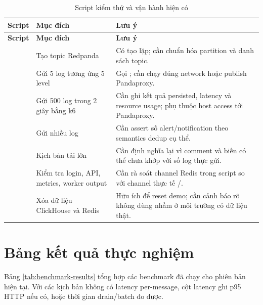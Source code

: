 \begin{longtable}{|P{4.0cm}|P{4.3cm}|P{5.5cm}|}
\caption{Script kiểm thử và vận hành hiện có}
\label{tab:scripts}\\
\hline
\textbf{Script} & \textbf{Mục đích} & \textbf{Lưu ý} \\ \hline
\endfirsthead
\hline
\textbf{Script} & \textbf{Mục đích} & \textbf{Lưu ý} \\ \hline
\endhead
{} & Tạo topic Redpanda & Có tạo  lặp; cần chuẩn hóa partition và danh sách topic. \\ \hline
{} & Gửi 5 log tương ứng 5 level & Gọi ; cần chạy đúng network hoặc publish Pandaproxy. \\ \hline
{} & Gửi 500 log trong 2 giây bằng k6 & Cần ghi kết quả persisted, latency và resource usage; phụ thuộc host access tới Pandaproxy. \\ \hline
{} & Gửi nhiều log  & Cần assert số alert/notification theo semantics dedup cụ thể. \\ \hline
{} & Kịch bản tải lớn & Cần định nghĩa lại vì comment và biến có thể chưa khớp với số log thực gửi. \\ \hline
{} & Kiểm tra login, API, metrics, worker output & Cần rà soát channel Redis trong script so với channel thực tế /. \\ \hline
{} & Xóa dữ liệu ClickHouse và Redis & Hữu ích để reset demo; cần cảnh báo rõ không dùng nhầm ở môi trường có dữ liệu thật. \\ \hline
\end{longtable}

\section{Bảng kết quả thực nghiệm}

Bảng \ref{tab:benchmark-results} tổng hợp các benchmark đã chạy cho phiên bản hiện tại. Với các kịch bản không có latency per-message, cột latency ghi p95 HTTP nếu có, hoặc thời gian drain/batch đo được.

